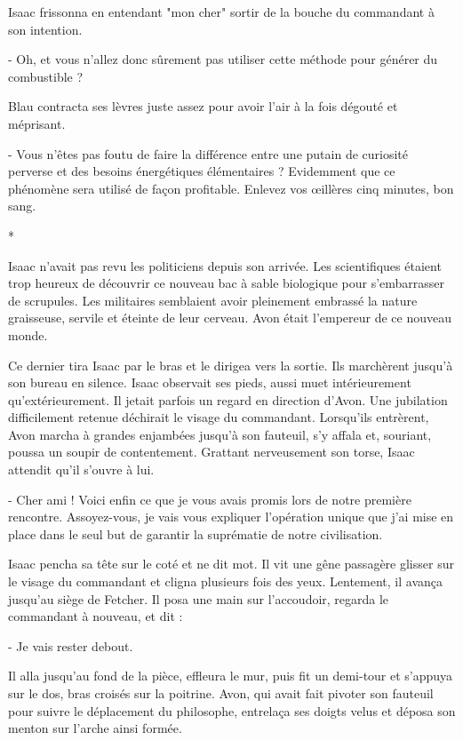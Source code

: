 \documentclass[12pt]{book}
\newcommand{\s}{\begin{center}
*
\end{center}
}
\begin{document}
Isaac frissonna en entendant "mon cher" sortir de la bouche du commandant à son intention.


- Oh, et vous n'allez donc sûrement pas utiliser cette méthode pour générer du combustible ?


Blau contracta ses lèvres juste assez pour avoir l'air à la fois dégouté et méprisant.


- Vous n'êtes pas foutu de faire la différence entre une putain de curiosité perverse et des besoins énergétiques élémentaires ? Evidemment que ce phénomène sera utilisé de façon profitable. Enlevez vos œillères cinq minutes, bon sang.


\s

Isaac n'avait pas revu les politiciens depuis son arrivée. Les scientifiques étaient trop heureux de découvrir ce nouveau bac à sable biologique pour s'embarrasser de scrupules. Les militaires semblaient avoir pleinement embrassé la nature graisseuse, servile et éteinte de leur cerveau. Avon était l'empereur de ce nouveau monde.


Ce dernier tira Isaac par le bras et le dirigea vers la sortie. Ils marchèrent jusqu'à son bureau en silence. Isaac observait ses pieds, aussi muet intérieurement qu'extérieurement. Il jetait parfois un regard en direction d'Avon. Une jubilation difficilement retenue déchirait le visage du commandant. Lorsqu'ils entrèrent, Avon marcha à grandes enjambées jusqu'à son fauteuil, s'y affala et, souriant, poussa un soupir de contentement. Grattant nerveusement son torse, Isaac attendit qu'il s'ouvre à lui.


- Cher ami ! Voici enfin ce que je vous avais promis lors de notre première rencontre. Assoyez-vous, je vais vous expliquer l'opération unique que j'ai mise en place dans le seul but de garantir la suprématie de notre civilisation.


Isaac pencha sa tête sur le coté et ne dit mot. Il vit une gêne passagère glisser sur le visage du commandant et cligna plusieurs fois des yeux. Lentement, il avança jusqu'au siège de Fetcher. Il posa une main sur l'accoudoir, regarda le commandant à nouveau, et dit :

- Je vais rester debout.

Il alla jusqu'au fond de la pièce, effleura le mur, puis fit un demi-tour et s'appuya sur le dos, bras croisés sur la poitrine. Avon, qui avait fait pivoter son fauteuil pour suivre le déplacement du philosophe, entrelaça ses doigts velus et déposa son menton sur l'arche ainsi formée.
\end{document}

